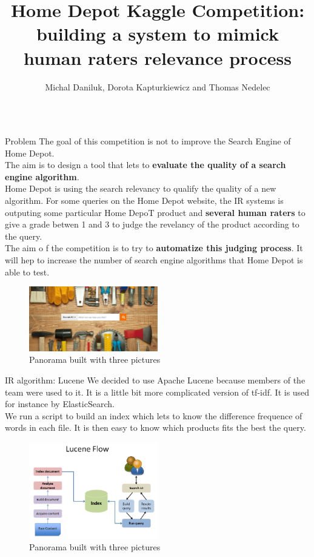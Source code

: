 \documentclass{beamer}
\title{Home Depot Kaggle Competition: building a system to mimick human raters relevance process}
\author{Michal Daniluk, Dorota Kapturkiewicz and Thomas Nedelec}
\institute{%
  Department of Computing Science,
  University College London
}
\newlength\postercolumnwidth
\newlength\totalwidth
\begin{document}
\begin{frame}[t]{}
\centering
\begin{columns}[totalwidth=\totalwidth]
  \begin{column}[t]{\postercolumnwidth}
    \centering
    \begin{block}{Problem}
\small
 The goal of this competition is not to improve the Search Engine of Home Depot. 
\\ The aim is to design a tool that lets to \textbf{evaluate the quality of a search engine algorithm}. \\Home Depot is using the search relevancy to qualify the quality of a new algorithm. For some queries on the Home Depot website, the IR systems is outputing some particular Home DepoT product and \textbf{several human raters} to give a grade betwen 1 and 3 to judge the revelancy of the product according to the query. 
\\The aim o
f the competition is to try to \textbf{automatize this judging process}. It will hep to increase the number of search engine algorithms that Home Depot is able to test.
    
 \begin{figure}[H]
\center
\includegraphics[width=0.5\textwidth]{home_depot_tools}
\caption{ Panorama built with three pictures}
\end{figure}
    
\end{block}
    \begin{block}{IR algorithm: Lucene}
\small
We decided to use Apache Lucene because members of the team were used to it. It is a little bit more complicated version of tf-idf. It is used for instance by ElasticSearch.
\\ We run a script to build an index which lets to know the difference frequence of words in each file. It is then easy to know which products fits the best the query.

  \begin{figure}[H]
\center
\includegraphics[width=0.5\textwidth]{lucence-flow}
\caption{ Panorama built with three pictures}
\end{figure}



\end{block}
\end{column}
\end{columns}
\end{frame}
\end{document}
